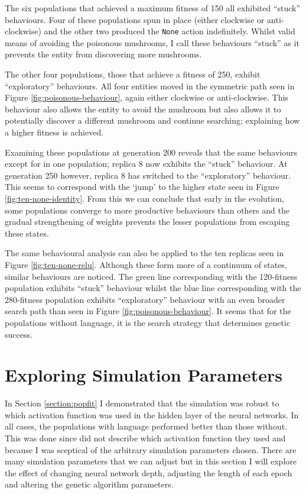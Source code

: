 \documentclass[12pt,a4paper,twoside,openright]{report}
\begin{document}
The six populations that achieved a maximum fitness of 150 all exhibited ``stuck'' behaviours. Four of these populations spun in place (either clockwise or anti-clockwise) and the other two produced the \verb~None~ action indefinitely. Whilst valid means of avoiding the poisonous mushrooms, I call these behaviours ``stuck'' as it prevents the entity from discovering more mushrooms.

The other four populations, those that achieve a fitness of 250, exhibit ``exploratory'' behaviours. All four entities moved in the symmetric path seen in Figure \ref{fig:poisonous-behaviour}, again either clockwise or anti-clockwise. This behaviour also allows the entity to avoid the mushroom but also allows it to potentially discover a different mushroom and continue searching; explaining how a higher fitness is achieved. 

Examining these populations at generation 200 reveals that the same behaviours except for in one population; replica 8 now exhibits the ``stuck'' behaviour. At generation 250 however, replica 8 has switched to the ``exploratory'' behaviour. This seems to correspond with the `jump' to the higher state seen in Figure \ref{fig:ten-none-identity}. From this we can conclude that early in the evolution, some populations converge to more productive behaviours than others and the gradual strengthening of weights prevents the lesser populations from escaping these states.

The same behavioural analysis can also be applied to the ten replicas seen in Figure \ref{fig:ten-none-relu}. Although these form more of a continuum of states, similar behaviours are noticed. The green line corresponding with the 120-fitness population exhibits ``stuck'' behaviour whilst the blue line corresponding with the 280-fitness population exhibits ``exploratory'' behaviour with an even broader search path than seen in Figure \ref{fig:poisonous-behaviour}. It seems that for the populations without language, it is the search strategy that determines genetic success.

\section{Exploring Simulation Parameters}\label{section:simulation-parameters}


In Section \ref{section:popfit} I demonstrated that the simulation was robust to which activation function was used in the hidden layer of the neural networks. In all cases, the populations with language performed better than those without. This was done since \citet{Cangelosi1998} did not describe which activation function they used and because I was sceptical of the arbitrary simulation parameters chosen. There are many simulation parameters that we can adjust but in this section I will explore the effect of changing neural network depth, adjusting the length of each epoch and altering the genetic algorithm parameters.
\end{document}
